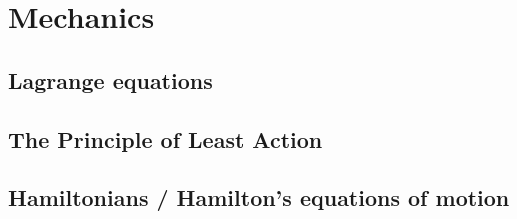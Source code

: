 \section{Mechanics}

\subsection{Lagrange equations}

\subsection{The Principle of Least Action}

\subsection{Hamiltonians / Hamilton's equations of motion}

